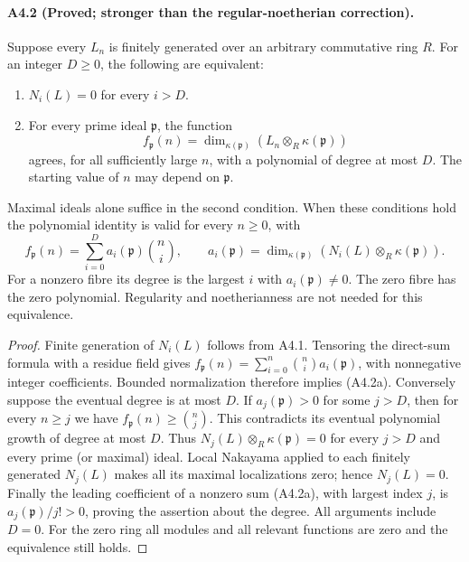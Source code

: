 \paragraph{A4.2 (Proved; stronger than the regular-noetherian correction).}
\label{A4.2}
Suppose every $L_n$ is finitely generated over an arbitrary
commutative ring $R$.  For an integer $D\geq0$, the following are
equivalent:
\begin{enumerate}
\item $N_i(L)=0$ for every $i>D$.
\item For every prime ideal $\mathfrak p$, the function
\[
 f_{\mathfrak p}(n)=
 \dim_{\kappa(\mathfrak p)}(L_n\otimes_R\kappa(\mathfrak p))
\]
agrees, for all sufficiently large $n$, with a polynomial of degree
at most $D$.  The starting value of $n$ may depend on $\mathfrak p$.
\end{enumerate}
Maximal ideals alone suffice in the second condition.  When these
conditions hold the polynomial identity is valid for every
$n\geq0$, with
\[
 f_{\mathfrak p}(n)=\sum_{i=0}^{D}
 a_i(\mathfrak p)\binom ni,
 \qquad a_i(\mathfrak p)=
 \dim_{\kappa(\mathfrak p)}(N_i(L)\otimes_R\kappa(\mathfrak p)).
 \tag{A4.2a}
\]
For a nonzero fibre its degree is the largest $i$ with
$a_i(\mathfrak p)\ne0$.  The zero fibre has the zero polynomial.
Regularity and noetherianness are not needed for this equivalence.

\begin{proof}
Finite generation of $N_i(L)$ follows from A4.1.  Tensoring the
direct-sum formula with a residue field gives
$f_{\mathfrak p}(n)=\sum_{i=0}^{n}\binom ni a_i(\mathfrak p)$,
with nonnegative integer coefficients.  Bounded normalization
therefore implies (A4.2a).  Conversely suppose the eventual degree
is at most $D$.  If $a_j(\mathfrak p)>0$ for some $j>D$, then for
every $n\geq j$ we have
$f_{\mathfrak p}(n)\geq\binom nj$.  This contradicts its eventual
polynomial growth of degree at most $D$.  Thus
$N_j(L)\otimes_R\kappa(\mathfrak p)=0$ for every $j>D$ and every
prime (or maximal) ideal.  Local Nakayama applied to each finitely
generated $N_j(L)$ makes all its maximal localizations zero;
hence $N_j(L)=0$.  Finally the leading coefficient of a nonzero
sum (A4.2a), with largest index $j$, is
$a_j(\mathfrak p)/j!>0$, proving the assertion about the degree.
All arguments include $D=0$.  For the zero ring all modules and
all relevant functions are zero and the equivalence still holds.
\end{proof}


